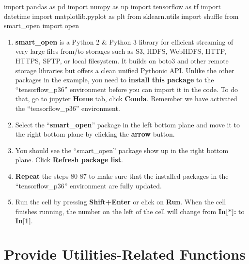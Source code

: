 \documentclass[]{book}
\newenvironment{Shaded}{\begin{snugshade}}{\end{snugshade}}
\newcommand{\ImportTok}[1]{#1}
\newcommand{\BuiltInTok}[1]{#1}
\newcommand{\NormalTok}[1]{#1}
\providecommand{\tightlist}{%
  \setlength{\itemsep}{0pt}\setlength{\parskip}{0pt}}
\begin{document}
\begin{Shaded}
\begin{Highlighting}[]
\ImportTok{import}\NormalTok{ pandas }\ImportTok{as}\NormalTok{ pd}
\ImportTok{import}\NormalTok{ numpy }\ImportTok{as}\NormalTok{ np}
\ImportTok{import}\NormalTok{ tensorflow }\ImportTok{as}\NormalTok{ tf}
\ImportTok{import}\NormalTok{ datetime}
\ImportTok{import}\NormalTok{ matplotlib.pyplot }\ImportTok{as}\NormalTok{ plt}
\ImportTok{from}\NormalTok{ sklearn.utils }\ImportTok{import}\NormalTok{ shuffle}
\ImportTok{from}\NormalTok{ smart_open }\ImportTok{import} \BuiltInTok{open}
\end{Highlighting}
\end{Shaded}

\begin{enumerate}
\def\labelenumi{\arabic{enumi}.}
\setcounter{enumi}{88}
\tightlist
\item
  \textbf{smart\_open} is a Python 2 \& Python 3 library for efficient streaming of very large files from/to storages such as S3, HDFS, WebHDFS, HTTP, HTTPS, SFTP, or local filesystem. It builds on boto3 and other remote storage libraries but offers a clean unified Pythonic API. Unlike the other packages in the example, you need to \textbf{install this package} to the ``tensorflow\_p36'' environment before you can import it in the code. To do that, go to jupyter \textbf{Home} tab, click \textbf{Conda}. Remember we have activated the ``tensorflow\_p36'' environment.
\item
  Select the ``\textbf{smart\_open}'' package in the left bottom plane and move it to the right bottom plane by clicking the \textbf{arrow} button.
\item
  You should see the ``smart\_open'' package show up in the right bottom plane. Click \textbf{Refresh package list}.
\item
  \textbf{Repeat} the steps 80-87 to make sure that the installed packages in the ``tensorflow\_p36'' environment are fully updated.
\item
  Run the cell by pressing \textbf{Shift+Enter} or click on \textbf{Run}. When the cell finishes running, the number on the left of the cell will change from \textbf{In{[}*{]}:} to \textbf{In{[}1{]}}.
\end{enumerate}

\hypertarget{provide-utilities-related-functions}{%
\section{Provide Utilities-Related Functions}\label{provide-utilities-related-functions}}
\end{document}
